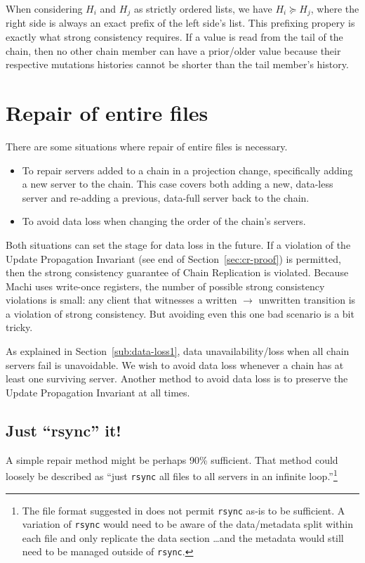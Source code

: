 \documentclass[preprint,10pt]{sigplanconf}
\begin{document}
When considering $H_i$ and $H_j$ as strictly ordered lists, we have 
$H_i \succeq H_j$, where the right side is always an exact prefix of the left
side's list.  This prefixing propery is exactly what strong
consistency requires.  If a value is read from the tail of the chain,
then no other chain member can have a prior/older value because their
respective mutations histories cannot be shorter than the tail
member's history.

\section{Repair of entire files}
\label{sec:repair-entire-files}

There are some situations where repair of entire files is necessary.

\begin{itemize}
\item To repair servers added to a chain in a projection change,
  specifically adding a new server to the chain.  This case covers both
  adding a new, data-less server and re-adding a previous, data-full server
  back to the chain.
\item To avoid data loss when changing the order of the chain's servers.
\end{itemize}

Both situations can set the stage for data loss in the future.
If a violation of the Update Propagation Invariant (see end of
Section~\ref{sec:cr-proof}) is permitted, then the strong consistency
guarantee of Chain Replication is violated.  Because Machi uses
write-once registers, the number of possible strong consistency
violations is small: any client that witnesses a written $\rightarrow$
unwritten transition is a violation of strong consistency.  But
avoiding even this one bad scenario is a bit tricky.

As explained in Section~\ref{sub:data-loss1}, data
unavailability/loss when all chain servers fail is unavoidable.  We
wish to avoid data loss whenever a chain has at least one surviving
server.  Another method to avoid data loss is to preserve the Update
Propagation Invariant at all times.

\subsection{Just ``rsync'' it!}
\label{ssec:just-rsync-it}

A simple repair method might be perhaps 90\% sufficient.
That method could loosely be described as ``just {\tt rsync}
all files to all servers in an infinite loop.''\footnote{The
  file format suggested in
  \cite{machi-design} does not permit {\tt rsync}
  as-is to be sufficient.  A variation of {\tt rsync} would need to be
  aware of the data/metadata split within each file and only replicate
  the data section \ldots and the metadata would still need to be
  managed outside of {\tt rsync}.}
\end{document}
